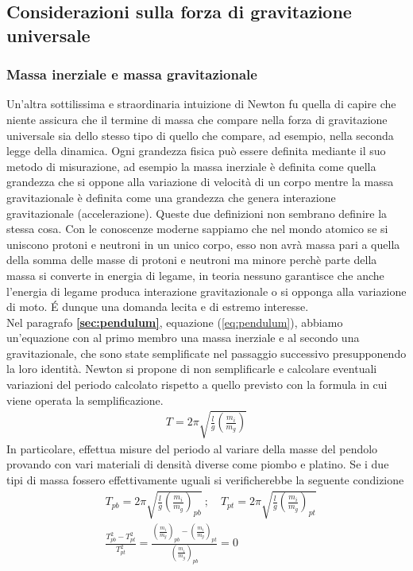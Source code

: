 \documentclass[10pt,a4paper]{article}
\begin{document}
\subsection{Considerazioni sulla forza di gravitazione universale}
\subsubsection{Massa inerziale e massa gravitazionale}
 Un'altra sottilissima e straordinaria intuizione di Newton fu quella di capire che niente assicura che il termine di massa che compare nella forza di gravitazione universale sia dello stesso tipo di quello che compare, ad esempio, nella seconda legge della dinamica. Ogni grandezza fisica può essere definita mediante il suo metodo di misurazione, ad esempio la massa inerziale è definita come quella grandezza che si oppone alla variazione di velocità di un corpo mentre la massa gravitazionale è definita come una grandezza che genera interazione gravitazionale (accelerazione). Queste due definizioni non sembrano definire la stessa cosa. Con le conoscenze moderne sappiamo che nel mondo atomico se si uniscono protoni e neutroni in un unico corpo, esso non avrà massa pari a quella della somma delle masse di protoni e neutroni ma minore perchè parte della massa si converte in energia di legame, in teoria nessuno garantisce che anche l'energia di legame produca interazione gravitazionale o si opponga alla variazione di moto. \'{E} dunque una domanda lecita e di estremo interesse.\\
 Nel paragrafo \textbf{\ref{sec:pendulum}}, equazione (\ref{eq:pendulum}), abbiamo un'equazione con al primo membro una massa inerziale e al secondo una gravitazionale, che sono state semplificate nel passaggio successivo presupponendo la loro identità. Newton si propone di non semplificarle e calcolare eventuali variazioni del periodo calcolato rispetto a quello previsto con la formula in cui viene operata la semplificazione.
 \begin{align*}
  T = 2\pi \sqrt{\frac{l}{g} (\frac{m_i}{m_g})}
 \end{align*}
In particolare, effettua misure del periodo al variare della masse del pendolo provando con vari materiali di densità diverse come piombo e platino. Se i due tipi di massa fossero effettivamente uguali si verificherebbe la seguente condizione
\begin{align*}
	 &T_{pb} = 2\pi \sqrt{\frac{l}{g} (\frac{m_i}{m_g})_{pb}}\ ; \quad  T_{pt} = 2\pi \sqrt{\frac{l}{g} (\frac{m_i}{m_g})_{pt}}\\
	 &\frac{T_{pb}^2-T_{pt}^2}{T_{pt}^2}=\frac{(\frac{m_i}{m_g})_{pb}-(\frac{m_i}{m_g})_{pt}}{(\frac{m_i}{m_g})_{pb}}=0
\end{align*}
\end{document}
